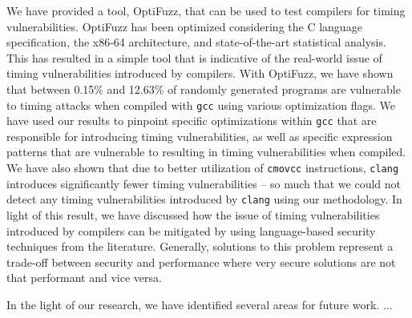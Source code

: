We have provided a tool, OptiFuzz, that can be used to test compilers for timing vulnerabilities.
OptiFuzz has been optimized considering the C language specification, the x86-64 architecture, and state-of-the-art statistical analysis.
This has resulted in a simple tool that is indicative of the real-world issue of timing vulnerabilities introduced by compilers.
With OptiFuzz, we have shown that between 0.15\% and 12.63\% of randomly generated programs are vulnerable to timing attacks when compiled with \texttt{gcc} using various optimization flags.
We have used our results to pinpoint specific optimizations within \texttt{gcc} that are responsible for introducing timing vulnerabilities, as well as specific expression patterns that are vulnerable to resulting in timing vulnerabilities when compiled.
We have also shown that due to better utilization of \texttt{cmovcc} instructions, \texttt{clang} introduces significantly fewer timing vulnerabilities -- so much that we could not detect any timing vulnerabilities introduced by \texttt{clang} using our methodology.
In light of this result, we have discussed how the issue of timing vulnerabilities introduced by compilers can be mitigated by using language-based security techniques from the literature.
Generally, solutions to this problem represent a trade-off between security and performance where very secure solutions are not that performant and vice versa.

In the light of our research, we have identified several areas for future work. $\ldots$